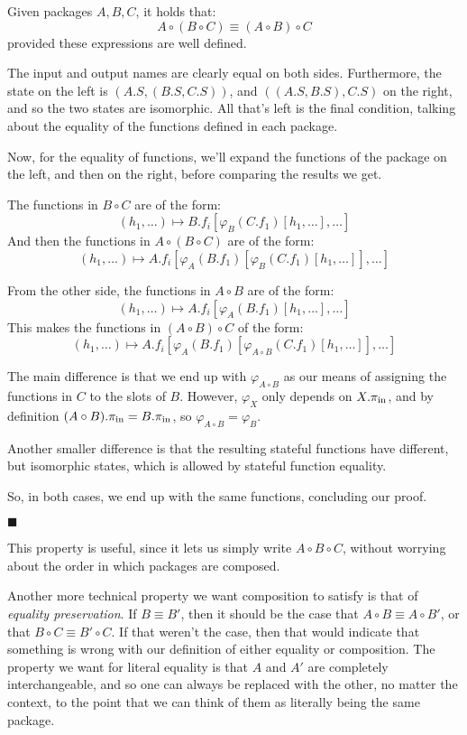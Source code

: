 \begin{lemma}
    Given packages $A, B, C$, it holds that:
    $$
    A \circ (B \circ C) \equiv (A \circ B) \circ C
    $$
    provided these expressions are well defined.

     The input and output names are clearly equal on both sides.
    Furthermore, the state on the left is $(A.S, (B.S, C.S))$,
    and $((A.S, B.S), C.S)$ on the right, and so the two states are isomorphic.
    All that's left is the final condition, talking about the equality
    of the functions defined in each package.

    Now, for the equality of functions, we'll expand the functions
    of the package on the left, and then on the right, before comparing
    the results we get.

    The functions in $B \circ C$ are of the form:
    $$
    (h_1, \ldots) \mapsto B.f_i[\varphi_{B}(C.f_1)[h_1, \ldots], \ldots]
    $$
    And then the functions in $A \circ (B \circ C)$ are of the form:
    $$
    (h_1, \ldots) \mapsto A.f_i[\varphi_{A}(B.f_1)[\varphi_{B}(C.f_1)[h_1, \ldots]], \ldots]
    $$

    From the other side, the functions in $A \circ B$ are of the form:
    $$
    (h_1, \ldots) \mapsto A.f_i[\varphi_{A}(B.f_1)[h_1, \ldots], \ldots]
    $$
    This makes the functions in $(A \circ B) \circ C$ of the form:
    $$
    (h_1, \ldots) \mapsto A.f_i[\varphi_{A}(B.f_1)[\varphi_{A \circ B}(C.f_1)[h_1, \ldots]], \ldots]
    $$

    The main difference is that we end up with $\varphi_{A \circ B}$
    as our means of assigning the functions in $C$ to the slots
    of $B$.
    However, $\varphi_{X}$ only depends on $X.\pi_{\text{in}}$,
    and by definition $(A \circ B).\pi_{\text{in}} = B.\pi_{\text{in}}$,
    so $\varphi_{A \circ B} = \varphi_B$.

    Another smaller difference is that the resulting stateful functions
    have different, but isomorphic states, which is allowed
    by stateful function equality.

    So, in both cases, we end up with the same functions, concluding
    our proof.

    $\blacksquare$
\end{lemma}

This property is useful, since it lets us simply write $A \circ B \circ C$,
without worrying about the order in which packages are composed.

Another more technical property we want composition to satisfy is
that of \emph{equality preservation}.
If $B \equiv B'$, then it should be the case that $A \circ B \equiv A \circ B'$,
or that $B \circ C \equiv B' \circ C$.
If that weren't the case, then that would indicate that something is wrong
with our definition of either equality or composition.
The property we want for literal equality is that $A$ and $A'$ are completely
interchangeable, and so one can always be replaced with the other, no matter
the context, to the point that we can think of them as literally being the same
package.

